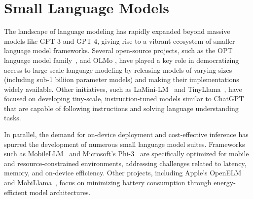 

\section{Small Language Models}

The landscape of language modeling has rapidly expanded beyond massive models like GPT-3 and GPT-4, giving rise to a vibrant ecosystem of smaller language model frameworks. Several open-source projects, such as the OPT language model family~\citep{zhang2022opt},  \citep{biderman2023pythia} and OLMo \citep{groeneveld2024olmo}, have played a key role in democratizing access to large-scale language modeling by releasing models of varying sizes (including sub-1 biliion parameter models) and making their implementations widely available. Other initiatives, such as LaMini-LM~\citep{wu2024lamini} and TinyLlama~\citep{zhang2024tinyllama}, have focused on developing tiny-scale, instruction-tuned models similar to ChatGPT that are capable of following instructions and solving language understanding tasks.

In parallel, the demand for on-device deployment and cost-effective inference has spurred the development of numerous small language model suites. Frameworks such as MobileLLM~\citep{liu2024mobilellm} and Microsoft's Phi-3~\citep{abdin2024phi} are specifically optimized for mobile and resource-constrained environments, addressing challenges related to latency, memory, and on-device efficiency. Other projects, including Apple's OpenELM~\citep{mehta2024openelm} and MobiLlama~\citep{thawakar2024mobillama}, focus on minimizing battery consumption through energy-efficient model architectures.

